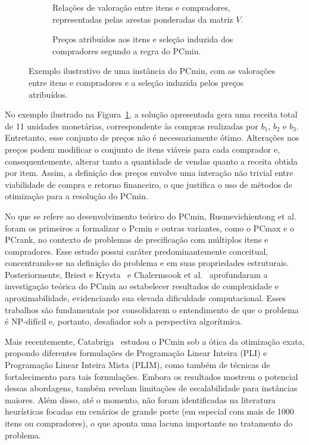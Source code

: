 \documentclass[11pt]{article}
\begin{document}
\begin{figure}[H]
\centering

\begin{subfigure}[t]{0.45\textwidth}
    \centering
    \conjuntoItensValorados
    \caption{Relações de valoração entre itens e compradores, representadas pelas arestas ponderadas da matriz $V$.}
\end{subfigure}
\hfill
\begin{subfigure}[t]{0.45\textwidth}
    \centering
    \conjuntoItensPrecificados
    \caption{Preços atribuídos aos itens e seleção induzida dos compradores segundo a regra do PCmin.}
\end{subfigure}

\caption{Exemplo ilustrativo de uma instância do PCmin, com as valorações entre itens e compradores e a seleção induzida pelos preços atribuídos.}
\label{fig:exemploPCmin}
\end{figure}

No exemplo ilustrado na Figura~\ref{fig:exemploPCmin}, a solução apresentada gera uma receita total de 11 unidades monetárias, correspondente às compras realizadas por $b_1$, $b_2$ e $b_3$. Entretanto, esse conjunto de preços não é necessariamente ótimo. Alterações nos preços podem modificar o conjunto de itens viáveis para cada comprador e, consequentemente, alterar tanto a quantidade de vendas quanto a receita obtida por item. Assim, a definição dos preços envolve uma interação não trivial entre viabilidade de compra e retorno financeiro, o que justifica o uso de métodos de otimização para a resolução do PCmin.

No que se refere ao desenvolvimento teórico do PCmin, Rusmevichientong et al.~\cite{rusmevichientong2006} foram os primeiros a formalizar o Pcmin e outras variantes, como o PCmax e o PCrank, no contexto de problemas de precificação com múltiplos itens e compradores. Esse estudo possui caráter predominantemente conceitual, concentrando-se na definição do problema e em suas propriedades estruturais. Posteriormente, Briest e Krysta~\cite{briest2007} e Chalermsook et al.~\cite{chalermsook2012} aprofundaram a investigação teórica do PCmin ao estabelecer resultados de complexidade e aproximabilidade, evidenciando sua elevada dificuldade computacional. Esses trabalhos são fundamentais por consolidarem o entendimento de que o problema é NP-difícil e, portanto, desafiador sob a perspectiva algorítmica. 

Mais recentemente, Catabriga~\cite{catabriga2025} estudou o PCmin sob a ótica da otimização exata, propondo diferentes formulações de Programação Linear Inteira (PLI) e Programação Linear Inteira Mista (PLIM), como também de técnicas de fortalecimento para tais formulações. Embora os resultados mostrem o potencial dessas abordagens, também revelam limitações de escalabilidade para instâncias maiores. Além disso, até o momento, não foram identificadas na literatura heurísticas focadas em cenários de grande porte (em especial com mais de 1000 itens ou compradores), o que aponta uma lacuna importante no tratamento do problema.
\end{document}
